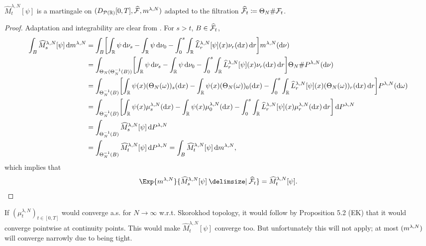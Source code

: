 \begin{corollary}\label{cor:hat-M-mart}
  \(\widehat{M}_t^{\lambda, N}[\psi]\) is a martingale on \((D_{\mathcal{P}(\mathbb{R})}[0,T], \widehat{\mathcal{F}}, m^{\lambda,N})\) adapted to the filtration \(\widehat{\mathcal{F}}_t \coloneqq \Theta_N \# \mathcal{F}_t\).
\end{corollary}
\begin{proof}
  Adaptation and integrability are clear from .
  For \(s > t\), \(B \in \widehat{\mathcal{F}}_t\),
  \begin{equation}
    \begin{split}
      \int_B \widehat{M}_{s}^{\lambda, N}[\psi] \odif{\lawmu^{\lambda,N}}
       & = \int_B \sbr*{ \int_\potspace \psi \odif{\nu_s} - \int_\potspace \psi \odif{\nu_0} - \int_0^s \int_\potspace \widehat{L}_r^{\lambda, N} [\psi](x) \nu_{r}(\odif{x}) \odif{r} } \lawmu^{\lambda,N} (\odif{\nu})                                                                          \\
       & = \int_{\Theta_N(\Theta_N^{-1}(B))} \sbr*{ \int_\potspace \psi \odif{\nu_s} - \int_\potspace \psi \odif{\nu_0} - \int_0^s \int_\potspace \widehat{L}_r^{\lambda, N} [\psi](x) \nu_{r}(\odif{x}) \odif{r} } \Theta_N \# P^{\lambda, N} (\odif{\nu})                                       \\
       & = \int_{\Theta_N^{-1}(B)} \sbr*{ \int_\potspace \psi(x) (\Theta_N(\omega))_s(\odif{x}) - \int_\potspace \psi(x) (\Theta_N(\omega))_0(\odif{x}) - \int_0^s \int_\potspace \widehat{L}_r^{\lambda, N} [\psi](x) (\Theta_N(\omega))_{r}(\odif{x}) \odif{r} } P^{\lambda, N} (\odif{\omega}) \\
       & = \int_{\Theta_N^{-1}(B)} \sbr*{ \int_\potspace \psi(x) \mu_s^{\lambda,N}(\odif{x}) - \int_\potspace \psi(x) \mu_0^{\lambda,N}(\odif{x}) - \int_0^s \int_\potspace \widehat{L}_r^{\lambda, N} [\psi](x) \mu_{r}^{\lambda,N}(\odif{x}) \odif{r} } \odif{P^{\lambda, N}}                   \\
       & = \int_{\Theta_N^{-1}(B)} \widehat{M}_s^{\lambda, N}[\psi] \odif{P^{\lambda, N}}                                                                                                                                                                                                         \\
       & = \int_{\Theta_N^{-1}(B)} \widehat{M}_t^{\lambda, N}[\psi] \odif{P^{\lambda, N}}
      = \int_B \widehat{M}_t^{\lambda, N}[\psi] \odif{\lawmu^{\lambda,N}},
    \end{split}
  \end{equation}
  which implies that
  \begin{equation}
    \Exp{\lawmu^{\lambda,N}}{\widehat{M}_{s}^{\lambda, N}[\psi] \given \widehat{\cF}_t} = \widehat{M}_t^{\lambda, N}[\psi].
  \end{equation}
\end{proof}


If \((\mu_t^{\lambda, N})_{t\in[0,T]}\) would converge a.s. for \(N\to\infty\) w.r.t. Skorokhod topology, it would follow by Proposition 5.2 (EK) that it would converge pointwise at continuity points.
This would make \(\widehat{M}_t^{\lambda, N}[\psi]\) converge too.
But unfortunately this will not apply; at most \((m^{\lambda,N})\) will converge narrowly due to being tight.